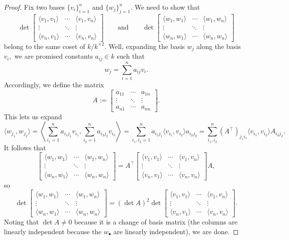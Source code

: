 \documentclass[../notes.tex]{subfiles}
\begin{document}
\begin{proof}
	Fix two bases $\{v_i\}_{i=1}^n$ and $\{w_j\}_{j=1}^n.$ We need to show that
	\[\det\begin{bmatrix}
		\langle v_1,v_1\rangle & \cdots & \langle v_1,v_n\rangle \\
		\vdots & \ddots & \vdots \\
		\langle v_n,v_1\rangle & \cdots & \langle v_n,v_n\rangle
	\end{bmatrix}\qquad\text{and}\qquad\det\begin{bmatrix}
		\langle w_1,w_1\rangle & \cdots & \langle w_1,w_n\rangle \\
		\vdots & \ddots & \vdots \\
		\langle w_n,w_1\rangle & \cdots & \langle w_n,w_n\rangle
	\end{bmatrix}\]
	belong to the same coset of $k/k^{\times2}.$ Well, expanding the basis $w_j$ along the basis $v_i,$ we are promised constants $a_{ij}\in k$ such that
	\[w_j=\sum_{i=1}^na_{ij}v_i.\]
	Accordingly, we define the matrix
	\[A:=\begin{bmatrix}
		a_{11} & \cdots & a_{1n} \\
		\vdots & \ddots & \vdots \\
		a_{n1} & \cdots & a_{nn}
	\end{bmatrix}.\]
	This lets us expand
	\[\langle w_{j_1},w_{j_2}\rangle=\left\langle\sum_{i_1=1}^na_{i_1j_1}v_{i_1},\sum_{i_2=1}^na_{i_2j_2}v_{i_2}\right\rangle=\sum_{i_1,i_2=1}^na_{i_1j_1}\langle v_{i_1},v_{i_2}\rangle a_{i_2j_2}=\sum_{i_1,i_2}^n(A^\intercal)_{j_1i_1}\langle v_{i_1},v_{i_2}\rangle A_{i_2j_2}.\]
	It follows that
	\[\begin{bmatrix}
		\langle w_1,w_1\rangle & \cdots & \langle w_1,w_n\rangle \\
		\vdots & \ddots & \vdots \\
		\langle w_n,w_1\rangle & \cdots & \langle w_n,w_n\rangle
	\end{bmatrix}=A^\intercal\begin{bmatrix}
		\langle v_1,v_1\rangle & \cdots & \langle v_1,v_n\rangle \\
		\vdots & \ddots & \vdots \\
		\langle v_n,v_1\rangle & \cdots & \langle v_n,v_n\rangle
	\end{bmatrix}A,\]
	so
	\[\det\begin{bmatrix}
		\langle w_1,w_1\rangle & \cdots & \langle w_1,w_n\rangle \\
		\vdots & \ddots & \vdots \\
		\langle w_n,w_1\rangle & \cdots & \langle w_n,w_n\rangle
	\end{bmatrix}=(\det A)^2\det\begin{bmatrix}
		\langle v_1,v_1\rangle & \cdots & \langle v_1,v_n\rangle \\
		\vdots & \ddots & \vdots \\
		\langle v_n,v_1\rangle & \cdots & \langle v_n,v_n\rangle
	\end{bmatrix}.\]
	Noting that $\det A\ne0$ because it is a change of basis matrix (the columns are linearly independent because the $w_\bullet$ are linearly independent), we are done.
\end{proof}
\end{document}
